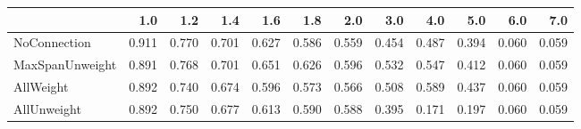\begin{tabular}{lrrrrrrrrrrr}
\toprule
{} &   1.0 &   1.2 &   1.4 &   1.6 &   1.8 &   2.0 &   3.0 &   4.0 &   5.0 &   6.0 &   7.0 \\
\midrule
NoConnection    & 0.911 & 0.770 & 0.701 & 0.627 & 0.586 & 0.559 & 0.454 & 0.487 & 0.394 & 0.060 & 0.059 \\
MaxSpanUnweight & 0.891 & 0.768 & 0.701 & 0.651 & 0.626 & 0.596 & 0.532 & 0.547 & 0.412 & 0.060 & 0.059 \\
AllWeight       & 0.892 & 0.740 & 0.674 & 0.596 & 0.573 & 0.566 & 0.508 & 0.589 & 0.437 & 0.060 & 0.059 \\
AllUnweight     & 0.892 & 0.750 & 0.677 & 0.613 & 0.590 & 0.588 & 0.395 & 0.171 & 0.197 & 0.060 & 0.059 \\
\bottomrule
\end{tabular}
